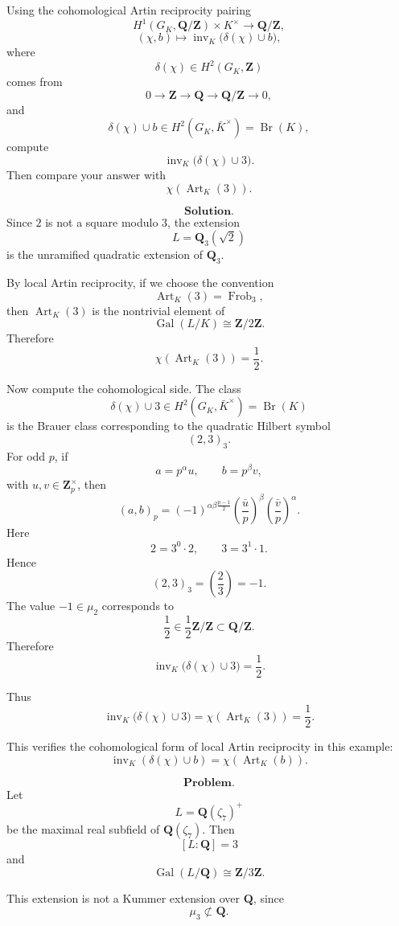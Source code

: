 {Using the cohomological Artin reciprocity pairing
\[
H^1(G_K,\mathbf Q/\mathbf Z)\times K^\times
\longrightarrow \mathbf Q/\mathbf Z,
\]
\[
(\chi,b)\longmapsto
\operatorname{inv}_K\bigl(\delta(\chi)\cup b\bigr),
\]
where
\[
\delta(\chi)\in H^2(G_K,\mathbf Z)
\]
comes from
\[
0\to \mathbf Z\to \mathbf Q\to \mathbf Q/\mathbf Z\to 0,
\]
and
\[
\delta(\chi)\cup b\in
H^2(G_K,\bar K^\times)=\operatorname{Br}(K),
\]
compute
\[
\operatorname{inv}_K\bigl(\delta(\chi)\cup 3\bigr).
\]
Then compare your answer with
\[
\chi(\operatorname{Art}_K(3)).
\]

\[
\textbf{Solution.}
\]
Since \(2\) is not a square modulo \(3\), the extension
\[
L=\mathbf Q_3(\sqrt 2)
\]
is the unramified quadratic extension of \(\mathbf Q_3\).

By local Artin reciprocity, if we choose the convention
\[
\operatorname{Art}_K(3)=\operatorname{Frob}_3,
\]
then \(\operatorname{Art}_K(3)\) is the nontrivial element of
\[
\operatorname{Gal}(L/K)\cong \mathbf Z/2\mathbf Z.
\]
Therefore
\[
\chi(\operatorname{Art}_K(3))=\frac12.
\]

Now compute the cohomological side. The class
\[
\delta(\chi)\cup 3
\in H^2(G_K,\bar K^\times)
=
\operatorname{Br}(K)
\]
is the Brauer class corresponding to the quadratic Hilbert symbol
\[
(2,3)_3.
\]
For odd \(p\), if
\[
a=p^\alpha u,\qquad b=p^\beta v,
\]
with \(u,v\in \mathbf Z_p^\times\), then
\[
(a,b)_p
=
(-1)^{\alpha\beta\frac{p-1}{2}}
\left(\frac{\bar u}{p}\right)^\beta
\left(\frac{\bar v}{p}\right)^\alpha.
\]
Here
\[
2=3^0\cdot 2,\qquad 3=3^1\cdot 1.
\]
Hence
\[
(2,3)_3
=
\left(\frac{2}{3}\right)
=
-1.
\]
The value \(-1\in \mu_2\) corresponds to
\[
\frac12\in \frac12\mathbf Z/\mathbf Z
\subset \mathbf Q/\mathbf Z.
\]
Therefore
\[
\operatorname{inv}_K\bigl(\delta(\chi)\cup 3\bigr)
=
\frac12.
\]

Thus
\[
\boxed{
\operatorname{inv}_K\bigl(\delta(\chi)\cup 3\bigr)
=
\chi(\operatorname{Art}_K(3))
=
\frac12.
}
\]

This verifies the cohomological form of local Artin reciprocity in this example:
\[
\boxed{
\operatorname{inv}_K(\delta(\chi)\cup b)
=
\chi(\operatorname{Art}_K(b)).
}
\]


\[
\textbf{Problem.}
\]
Let
\[
L=\mathbf Q(\zeta_7)^+
\]
be the maximal real subfield of \(\mathbf Q(\zeta_7)\). Then
\[
[L:\mathbf Q]=3
\]
and
\[
\operatorname{Gal}(L/\mathbf Q)\cong \mathbf Z/3\mathbf Z.
\]

This extension is not a Kummer extension over \(\mathbf Q\), since
\[
\mu_3\not\subset \mathbf Q.
\]

}
